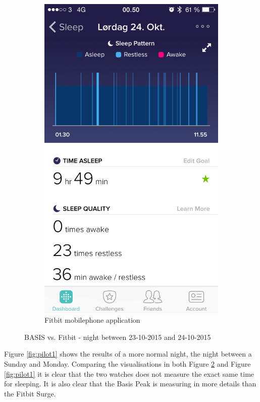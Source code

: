 \documentclass[12pt]{article} %
\begin{document}
\begin{figure}[H]
\begin{subfigure}[b]{0.45\textwidth}
        \includegraphics[width=\textwidth]{24-10-fitbit}
        \caption{Fitbit mobilephone application}
        \label{fig:fitbit0}
    \end{subfigure}
    \caption{BASIS vs. Fitbit - night between 23-10-2015 and 24-10-2015}
    \label{fig:pilot0}
\end{figure}

Figure \ref{fig:pilot1} shows the results of a more normal night, the night between a Sunday and Monday. Comparing the visualisations in both Figure \ref{fig:pilot0} and Figure \ref{fig:pilot1} it is clear that the two watches does not measure the exact same time for sleeping. It is also clear that the Basis Peak is measuring in more details than the Fitbit Surge. \\
\end{document}
